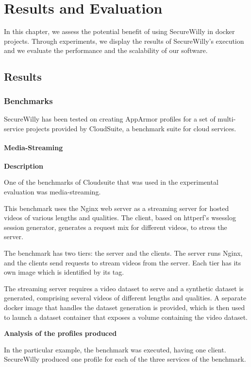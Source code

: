 \chapter{Results and Evaluation}

In this chapter, we assess the potential benefit of using SecureWilly in docker projects. Through experiments, we display the results of SecureWilly's execution and we evaluate the performance and the scalability of our software.

\section{Results}
\subsection{Benchmarks}
SecureWilly has been tested on creating AppArmor profiles for a set of multi-service projects provided by CloudSuite, a benchmark suite for cloud services. \cite{cloudsuite}

\subsubsection{Media-Streaming}
\textbf{Description}

One of the benchmarks of Cloudsuite that was used in the experimental evaluation was media-streaming. 

This benchmark uses the Nginx web server as a streaming server for hosted videos of various lengths and qualities. The client, based on httperf's wsesslog session generator, generates a request mix for different videos, to stress the server. \cite{mediastr}

The benchmark has two tiers: the server and the clients. The server runs Nginx, and the clients send requests to stream videos from the server. Each tier has its own image which is identified by its tag.

The streaming server requires a video dataset to serve and a synthetic dataset is generated, comprising several videos of different lengths and qualities. A separate docker image that handles the dataset generation is provided, which is then used to launch a dataset container that exposes a volume containing the video dataset.
\hfill\break

\textbf{Analysis of the profiles produced}

In the particular example, the benchmark was executed, having one client. SecureWilly produced one profile for each of the three services of the benchmark.
 
